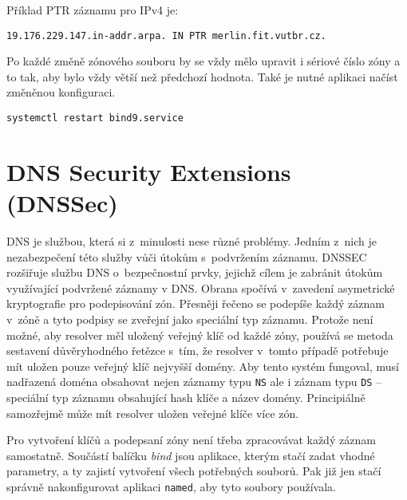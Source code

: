 Příklad PTR záznamu pro IPv4 je:
\begin{verbatim}
19.176.229.147.in-addr.arpa. IN	PTR	merlin.fit.vutbr.cz.
\end{verbatim}

Po každé změně zónového souboru by se vždy mělo upravit i sériové číslo zóny a to tak, aby bylo vždy větší než předchozí hodnota. Také je nutné aplikaci načíst změněnou konfiguraci.
\begin{verbatim}
systemctl restart bind9.service
\end{verbatim}


\section{DNS Security Extensions (DNSSec)}
\label{dnssec}

DNS je službou, která si z~minulosti nese různé problémy. Jedním z~nich je
nezabezpečení této služby vůči útokům s~podvržením záznamu.
DNSSEC rozšiřuje službu DNS o~bezpečnostní prvky, jejichž cílem je zabránit
útokům využívající podvržené záznamy v DNS. Obrana spočívá v~zavedení
asymetrické kryptografie pro podepisování zón. Přesněji řečeno se podepíše každý
záznam v~zóně a tyto podpisy se zveřejní jako speciální typ záznamu. Protože není možné, aby resolver měl uložený veřejný klíč od každé zóny, používá se metoda sestavení důvěryhodného řetězce s~tím, že resolver v~tomto případě potřebuje mít uložen pouze veřejný klíč nejvyšší domény. Aby tento systém fungoval, musí nadřazená doména obsahovat nejen záznamy typu {\tt NS} ale i záznam typu {\tt DS} -- speciální typ záznamu obsahující hash klíče a název domény. Principiálně samozřejmě může mít resolver uložen veřejné klíče více zón.

Pro vytvoření klíčů a podepsaní zóny není třeba zpracovávat každý záznam samostatně. Součástí balíčku {\em bind} jsou aplikace, kterým stačí zadat vhodné parametry, a ty zajistí vytvoření všech potřebných souborů. Pak již jen stačí správně nakonfigurovat aplikaci {\tt named}, aby tyto soubory používala.

